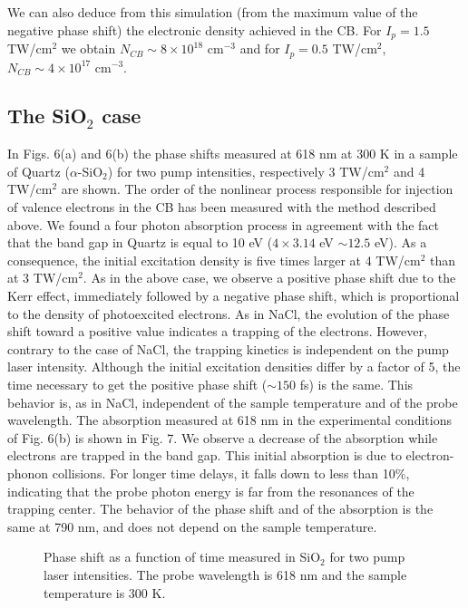 \documentclass[aps,prb,reprint]{revtex4-2}
\begin{document}
We can also deduce from this simulation (from the maximum value of the negative phase shift) the electronic density achieved in the CB. For $I_p = 1.5$ TW/cm$^2$ we obtain $N_{CB} \sim 8\times10^{18}$ cm$^{-3}$ and for $I_p = 0.5$ TW/cm$^2$, $N_{CB} \sim 4\times10^{17}$ cm$^{-3}$.

\subsection{The SiO$_2$ case}

In Figs. 6(a) and 6(b) the phase shifts measured at 618 nm at 300 K in a sample of Quartz ($\alpha$-SiO$_2$) for two pump intensities, respectively 3 TW/cm$^2$ and 4 TW/cm$^2$ are shown. The order of the nonlinear process responsible for injection of valence electrons in the CB has been measured with the method described above. We found a four photon absorption process in agreement with the fact that the band gap in Quartz is equal to 10 eV ($4\times 3.14$ eV $\sim 12.5$ eV). As a consequence, the initial excitation density is five times larger at 4 TW/cm$^2$ than at 3 TW/cm$^2$. As in the above case, we observe a positive phase shift due to the Kerr effect, immediately followed by a negative phase shift, which is proportional to the density of photoexcited electrons. As in NaCl, the evolution of the phase shift toward a positive value indicates a trapping of the electrons. However, contrary to the case of NaCl, the trapping kinetics is independent on the pump laser intensity. Although the initial excitation densities differ by a factor of 5, the time necessary to get the positive phase shift ($\sim 150$ fs) is the same. This behavior is, as in NaCl, independent of the sample temperature and of the probe wavelength. The absorption measured at 618 nm in the experimental conditions of Fig. 6(b) is shown in Fig. 7. We observe a decrease of the absorption while electrons are trapped in the band gap. This initial absorption is due to electron-phonon collisions. For longer time delays, it falls down to less than 10\%, indicating that the probe photon energy is far from the resonances of the trapping center. The behavior of the phase shift and of the absorption is the same at 790 nm, and does not depend on the sample temperature.

\begin{figure}[ht]
    \centering
    \caption{Phase shift as a function of time measured in SiO$_2$ for two pump laser intensities. The probe wavelength is 618 nm and the sample temperature is 300 K.}
    \label{fig:sio2_time}
\end{figure}
\end{document}

